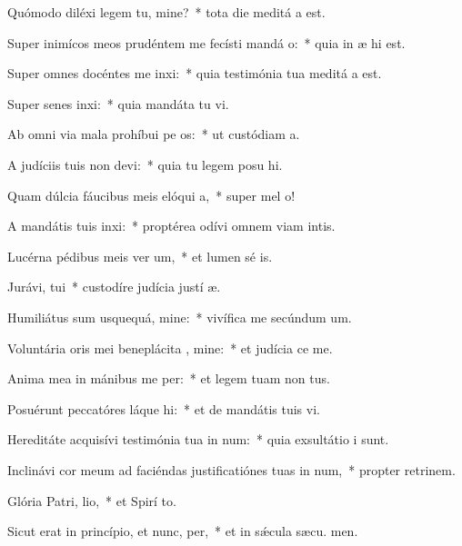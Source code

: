 \item Quómodo diléxi legem tu, mine?~* tota die meditá a est.
\item Super inimícos meos prudéntem me fecísti mandá o:~* quia in æ hi est.
\item Super omnes docéntes me inxi:~* quia testimónia tua meditá a est.
\item Super senes inxi:~* quia mandáta tu vi.
\item Ab omni via mala prohíbui pe os:~* ut custódiam  a.
\item A judíciis tuis non devi:~* quia tu legem posu hi.
\item Quam dúlcia fáucibus meis elóqui a,~* super mel  o!
\item A mandátis tuis inxi:~* proptérea odívi omnem viam intis.
\item Lucérna pédibus meis ver um,~* et lumen sé is.
\item Jurávi,  tui~* custodíre judícia justí æ.
\item Humiliátus sum usquequá, mine:~* vivífica me secúndum  um.
\item Voluntária oris mei beneplácita , mine:~* et judícia  ce me.
\item Anima mea in mánibus me per:~* et legem tuam non  tus.
\item Posuérunt peccatóres láque hi:~* et de mandátis tuis  vi.
\item Hereditáte acquisívi testimónia tua in num:~* quia exsultátio  i sunt.
\item Inclinávi cor meum ad faciéndas justificatiónes tuas in num,~* propter retrinem.
\item Glória Patri,  lio,~* et Spirí to.
\item Sicut erat in princípio, et nunc,  per,~* et in sǽcula sæcu. men.
